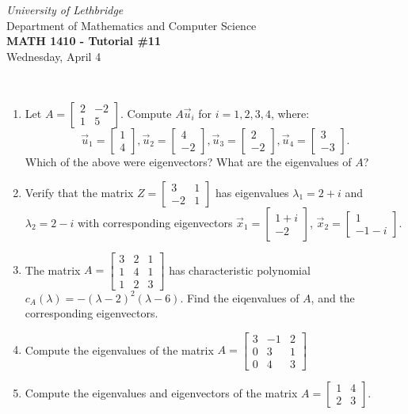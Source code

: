 \documentclass[12pt]{article}
\newcommand{\skipline}{\vspace{12pt}}
\newcommand{\bbm}{\begin{bmatrix}}
\newcommand{\ebm}{\end{bmatrix}}
\begin{document}
\author{Instructor: Sean Fitzpatrick}
\thispagestyle{empty}
\begin{center}
\emph{University of Lethbridge}\\
Department of Mathematics and Computer Science\\
{\bf MATH 1410 - Tutorial \#11}\\
Wednesday, April 4
\end{center}
\skipline \ \noindent \skipline

\vspace*{\fill}









\newpage

 \begin{enumerate}
 
\item Let $A = \bbm 2&-2\\1&5\ebm$. Compute $A\vec{u}_i$ for $i=1,2,3,4$, where:
\[
\vec{u}_1 =  \bbm 1\\4\ebm, \vec{u}_2 = \bbm 4\\-2\ebm, \vec{u}_3 = \bbm 2\\-2\ebm, \vec{u}_4 = \bbm 3\\-3\ebm.
\]
Which of the above were eigenvectors? What are the eigenvalues of $A$?

\vspace{3.5in}

\item Verify that the matrix $Z = \bbm 3&1\\-2&1\ebm$ has eigenvalues $\lambda_1 = 2 + i$ and $\lambda_2=2-i$ with corresponding eigenvectors $\vec{x}_1 = \bbm 1+i\\-2\ebm$, $\vec{x}_2 = \bbm 1\\-1-i\ebm$.

\newpage

\item The matrix $A = \bbm 3&2&1\\1&4&1\\1&2&3\ebm$ has characteristic polynomial $c_A(\lambda)=-(\lambda-2)^2(\lambda-6)$. Find the eiqenvalues of $A$, and the corresponding eigenvectors.

\newpage

\item Compute the eigenvalues of the matrix $A = \bbm 3&-1&2\\0&3&1\\0&4&3\ebm$

\vspace{3in}

\item Compute the eigenvalues and eigenvectors of the matrix $A = \bbm 1&4\\2&3\ebm$.




 \end{enumerate}
\end{document}
